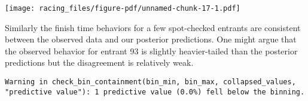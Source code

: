 \documentclass[
  letterpaper,
  DIV=11,
  numbers=noendperiod]{scrartcl}
\newenvironment{Shaded}{\begin{snugshade}}{\end{snugshade}}
\newcommand{\AttributeTok}[1]{\textcolor[rgb]{0.40,0.45,0.13}{#1}}
\newcommand{\ControlFlowTok}[1]{\textcolor[rgb]{0.00,0.23,0.31}{#1}}
\newcommand{\DecValTok}[1]{\textcolor[rgb]{0.68,0.00,0.00}{#1}}
\newcommand{\FunctionTok}[1]{\textcolor[rgb]{0.28,0.35,0.67}{#1}}
\newcommand{\NormalTok}[1]{\textcolor[rgb]{0.00,0.23,0.31}{#1}}
\newcommand{\OtherTok}[1]{\textcolor[rgb]{0.00,0.23,0.31}{#1}}
\newcommand{\SpecialCharTok}[1]{\textcolor[rgb]{0.37,0.37,0.37}{#1}}
\newcommand{\StringTok}[1]{\textcolor[rgb]{0.13,0.47,0.30}{#1}}
\begin{document}
\texttt{[image: racing\_files/figure-pdf/unnamed-chunk-17-1.pdf]}

Similarly the finish time behaviors for a few spot-checked entrants are
consistent between the observed data and our posterior predictions. One
might argue that the observed behavior for entrant 93 is slightly
heavier-tailed than the posterior predictions but the disagreement is
relatively weak.

\begin{Shaded}
\end{Shaded}

\begin{verbatim}
Warning in check_bin_containment(bin_min, bin_max, collapsed_values,
"predictive value"): 1 predictive value (0.0%) fell below the binning.
\end{verbatim}
\end{document}
